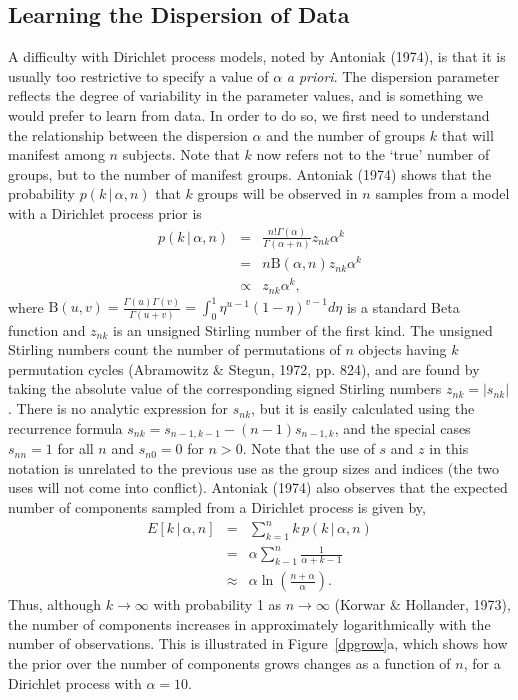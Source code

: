 \documentclass[authoryear]{elsarticle}
\newcommand{\condon}{\,|\,}
\begin{document}
\subsection{Learning the Dispersion of Data}

A difficulty with Dirichlet process models, noted by Antoniak (1974), is that
it is usually too restrictive to specify a value of $\alpha$ {\it a priori}. The dispersion
parameter reflects the degree of variability in the parameter values, and is something
we would prefer to learn from data. In order to do so, we
first need to understand the relationship between the dispersion $\alpha$ and the
number of groups $k$ that will manifest among $n$ subjects. Note that $k$ now
refers not to the `true' number of groups, but to the number of manifest groups.
Antoniak (1974) shows that the probability $p(k \condon \alpha, n)$ that $k$
groups will be observed in $n$ samples from a model with a Dirichlet process
prior is
\begin{eqnarray}
        p(k \condon \alpha, n) &=& \frac{n!  \Gamma(\alpha)}{\Gamma(\alpha+n)}
        z_{nk} \alpha^k \nonumber \\
        &=& n \mathrm{B}(\alpha,n)  z_{nk} \alpha^k \label{prioronk} \\
        &\propto& z_{nk} \alpha^k, \nonumber
\end{eqnarray}
where $\mbox{B}(u,v)=\frac{\Gamma(u)\Gamma(v)}{\Gamma(u+v)}=
\int^1_0 \eta^{u-1}(1-\eta)^{v-1} d\eta$ is a standard
Beta function and  $z_{nk}$ is an unsigned Stirling number of the first kind.
The unsigned Stirling numbers count the number of  permutations of $n$ objects
 having $k$ permutation cycles (Abramowitz \& Stegun, 1972, pp. 824), and are found
by taking the absolute value of the corresponding signed Stirling numbers
$z_{nk}=|s_{nk}|$. There is no analytic expression for $s_{nk}$, but it is easily
calculated using the recurrence formula $s_{nk}=s_{n-1,k-1} - (n-1)s_{n-1,k}$,
and the special cases $s_{nn}=1$ for all $n$ and $s_{n0}=0$ for $n>0$. Note that
the use of $s$ and $z$ in this notation is unrelated to the previous use as the group
sizes and indices (the two uses will not come into conflict). Antoniak (1974) also
observes that the expected number of components sampled from a Dirichlet
process is given by,
\begin{eqnarray}
        E[k\condon \alpha, n] &=&
        \sum_{k=1}^{n} k \, p(k \condon \alpha, n)  \nonumber \\
        &=& \alpha \sum_{k-1}^n \frac{1}{\alpha + k -1} \nonumber \\
        &\approx& \alpha \ln\left(\frac{n+\alpha}{\alpha}\right).
        \label{kgrow}
\end{eqnarray}
Thus, although $k \rightarrow \infty$ with probability 1 as
$n \rightarrow \infty$ (Korwar \& Hollander, 1973), the number of components
increases in approximately logarithmically with the number of observations.
This is illustrated in Figure~\ref{dpgrow}a, which shows how the prior
over the number of components grows changes as a function of $n$, for a Dirichlet
process with $\alpha=10$.
\end{document}
